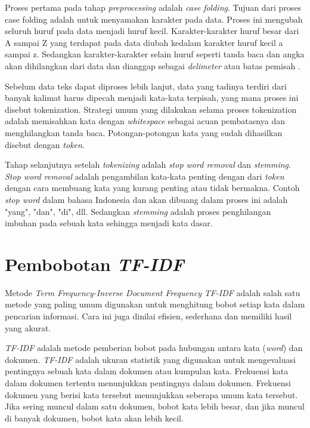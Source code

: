 Proses pertama pada tahap \textit{preprocessing} adalah \textit{case folding}. Tujuan dari proses case folding adalah untuk menyamakan karakter pada data. Proses ini mengubah seluruh huruf pada data menjadi huruf kecil. Karakter-karakter huruf besar dari A sampai Z yang terdapat pada data diubah kedalam karakter huruf kecil a sampai z. Sedangkan karakter-karakter selain huruf seperti tanda baca dan angka akan dihilangkan dari data dan dianggap sebagai \textit{delimeter} atau batas pemisah \citep{manning2009anintroduction}.

Sebelum data teks dapat diproses lebih lanjut, data yang tadinya terdiri dari banyak kalimat harus dipecah menjadi kata-kata terpisah, yang mana proses ini disebut tokenization. Strategi umum yang dilakukan selama proses tokenization adalah memisahkan kata dengan \textit{whitespace} sebagai acuan pembatasnya dan menghilangkan tanda baca. Potongan-potongan kata yang sudah dihasilkan disebut dengan \textit{token}.

Tahap selanjutnya setelah \textit{tokenizing} adalah \textit{stop word removal} dan \textit{stemming}. \textit{Stop word removal} adalah pengambilan kata-kata penting dengan dari \textit{token} dengan cara membuang kata yang kurang penting atau tidak bermakna. Contoh \textit{stop word} dalam bahasa Indonesia dan akan dibuang dalam proses ini adalah "yang", "dan", "di", dll. Sedangkan \textit{stemming} adalah proses penghilangan imbuhan pada sebuah kata sehingga menjadi kata dasar.

\section{Pembobotan \emph{TF-IDF}}
Metode \textit{Term Frequency-Inverse Document Frequency} \textit{TF-IDF} adalah salah satu metode yang paling umum digunakan untuk menghitung bobot setiap kata dalam pencarian informasi. Cara ini juga dinilai efisien, sederhana dan memiliki hasil yang akurat.

\textit{TF-IDF} adalah metode pemberian bobot pada hubungan antara kata (\textit{word}) dan dokumen. \textit{TF-IDF} adalah ukuran statistik yang digunakan untuk mengevaluasi pentingnya sebuah kata dalam dokumen atau kumpulan kata. Frekuensi kata dalam dokumen tertentu menunjukkan pentingnya dalam dokumen. Frekuensi dokumen yang berisi kata tersebut menunjukkan seberapa umum kata tersebut. Jika sering muncul dalam satu dokumen, bobot kata lebih besar, dan jika muncul di banyak dokumen, bobot kata akan lebih kecil.

